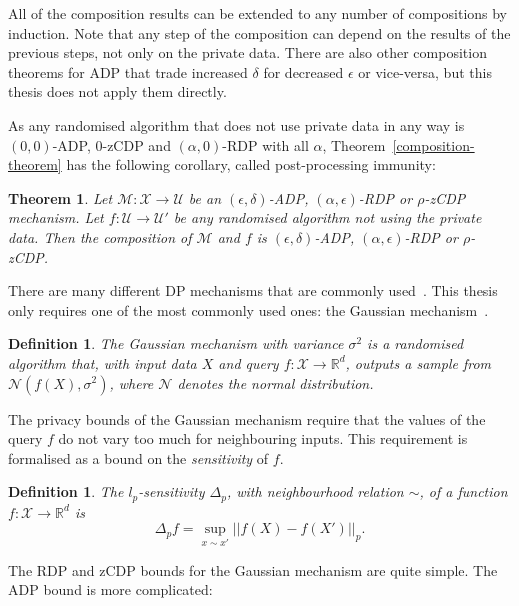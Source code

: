 \documentclass[english,twoside,openright]{HYgraduMLDS}
\newtheorem{theorem}[lemma]{Theorem}
\newtheorem{definition}[lemma]{Definition}
\newcommand{\R}{\mathbb{R}}
\newcommand{\calm}{{\mathcal{M}}}
\newcommand{\calx}{{\mathcal{X}}}
\newcommand{\calu}{{\mathcal{U}}}
\newcommand{\caln}{{\mathcal{N}}}
\begin{document}
All of the composition results can be extended to any number of compositions 
by induction. Note that any step of the composition can depend on the results 
of the previous steps, not only on the private data. There are also other composition
theorems for ADP that trade increased \(\delta\) for decreased \(\epsilon\)
or vice-versa, but this thesis does not apply them directly.

As any randomised algorithm that does not use private data in any way is
\((0, 0)\)-ADP, 0-zCDP and \((\alpha, 0)\)-RDP with all \(\alpha\), 
Theorem~\ref{composition-theorem} has the following corollary, called 
post-processing immunity:

\begin{theorem}
  Let \(\calm\colon \calx\to \calu\) be an \((\epsilon, \delta)\)-ADP,
  \((\alpha, \epsilon)\)-RDP or \(\rho\)-zCDP mechanism.
  Let \(f\colon \calu\to \calu'\) be any randomised algorithm
  not using the private data. Then the composition of \(\calm\) and \(f\)
  is \((\epsilon, \delta)\)-ADP, \((\alpha, \epsilon)\)-RDP or \(\rho\)-zCDP.
\end{theorem}

There are many different DP mechanisms that are commonly used~\cite{DwR14}.
This thesis only requires one of the most commonly 
used ones: the Gaussian mechanism~\cite{DKM06}.
\begin{definition}
  The Gaussian mechanism with variance \(\sigma^2\) is a randomised algorithm that,
  with input data \(X\) and query \(f\colon \calx\to \R^{d}\), outputs a sample from
  \(\caln(f(X), \sigma^2)\), where \(\caln\) denotes the normal distribution.
\end{definition}

The privacy bounds of the Gaussian mechanism require that the values of the
query \(f\) do not vary too much for neighbouring inputs. This requirement
is formalised as a bound on the \emph{sensitivity} of \(f\).
\begin{definition}
    The \(l_p\)-sensitivity \(\Delta_p\), with neighbourhood relation \(\sim\),
    of a function \(f\colon \calx \to \R^d\)
    is
    \[
        \Delta_p f = \sup_{x\sim x'}||f(X) - f(X')||_p.
    \]
\end{definition}

The RDP and zCDP bounds for the Gaussian 
mechanism are quite simple. The ADP bound is more complicated:
\end{document}
